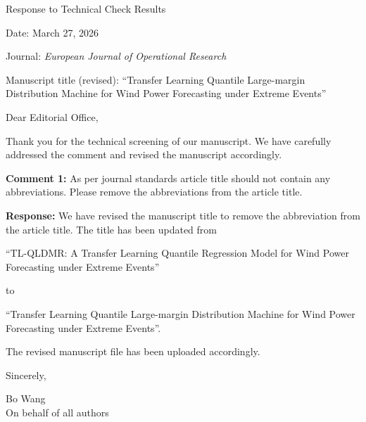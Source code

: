 \documentclass[11pt]{article}
\begin{document}
\begin{center}
{\Large Response to Technical Check Results}
\end{center}

\vspace{1em}

Date: March 27, 2026

\vspace{0.5em}

Journal: \textit{European Journal of Operational Research}

\vspace{0.5em}

Manuscript title (revised): ``Transfer Learning Quantile Large-margin Distribution Machine for Wind Power Forecasting under Extreme Events''

\vspace{1em}

Dear Editorial Office,

\vspace{0.5em}

Thank you for the technical screening of our manuscript. We have carefully addressed the comment and revised the manuscript accordingly.

\vspace{0.75em}

\textbf{Comment 1:} As per journal standards article title should not contain any abbreviations. Please remove the abbreviations from the article title.

\vspace{0.5em}

\textbf{Response:} We have revised the manuscript title to remove the abbreviation from the article title. The title has been updated from

\vspace{0.5em}

``TL-QLDMR: A Transfer Learning Quantile Regression Model for Wind Power Forecasting under Extreme Events''

\vspace{0.5em}

to

\vspace{0.5em}

``Transfer Learning Quantile Large-margin Distribution Machine for Wind Power Forecasting under Extreme Events''.

\vspace{0.5em}

The revised manuscript file has been uploaded accordingly.

\vspace{1em}

Sincerely,

\vspace{0.75em}

Bo Wang \\
On behalf of all authors
\end{document}
